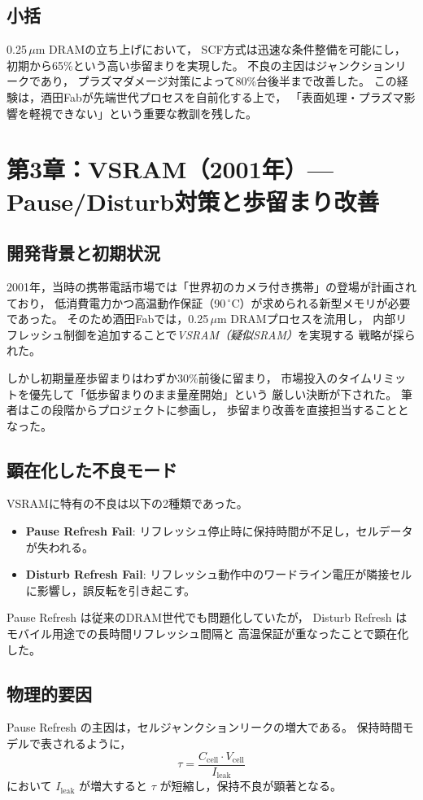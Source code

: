 \documentclass[conference]{IEEEtran}
\begin{document}
\subsection{小括}
0.25\,$\mu$m DRAMの立ち上げにおいて，
SCF方式は迅速な条件整備を可能にし，
初期から65\%という高い歩留まりを実現した。
不良の主因はジャンクションリークであり，
プラズマダメージ対策によって80\%台後半まで改善した。
この経験は，酒田Fabが先端世代プロセスを自前化する上で，
「表面処理・プラズマ影響を軽視できない」という重要な教訓を残した。

\section{第3章：VSRAM（2001年）— Pause/Disturb対策と歩留まり改善}

\subsection{開発背景と初期状況}
2001年，当時の携帯電話市場では「世界初のカメラ付き携帯」の登場が計画されており，
低消費電力かつ高温動作保証（90\,$^\circ$C）が求められる新型メモリが必要であった。
そのため酒田Fabでは，0.25\,$\mu$m DRAMプロセスを流用し，
内部リフレッシュ制御を追加することで\emph{VSRAM（疑似SRAM）}を実現する
戦略が採られた。

しかし初期量産歩留まりはわずか30\%前後に留まり，
市場投入のタイムリミットを優先して「低歩留まりのまま量産開始」という
厳しい決断が下された。
筆者はこの段階からプロジェクトに参画し，
歩留まり改善を直接担当することとなった。

\subsection{顕在化した不良モード}
VSRAMに特有の不良は以下の2種類であった。
\begin{itemize}
  \item \textbf{Pause Refresh Fail}: リフレッシュ停止時に保持時間が不足し，セルデータが失われる。
  \item \textbf{Disturb Refresh Fail}: リフレッシュ動作中のワードライン電圧が隣接セルに影響し，誤反転を引き起こす。
\end{itemize}

Pause Refresh は従来のDRAM世代でも問題化していたが，
Disturb Refresh はモバイル用途での長時間リフレッシュ間隔と
高温保証が重なったことで顕在化した。

\subsection{物理的要因}
Pause Refresh の主因は，セルジャンクションリークの増大である。
保持時間モデルで表されるように，
\[
\tau = \frac{C_{\mathrm{cell}} \cdot V_{\mathrm{cell}}}{I_{\mathrm{leak}}}
\]
において $I_{\mathrm{leak}}$ が増大すると $\tau$ が短縮し，保持不良が顕著となる。
\end{document}

